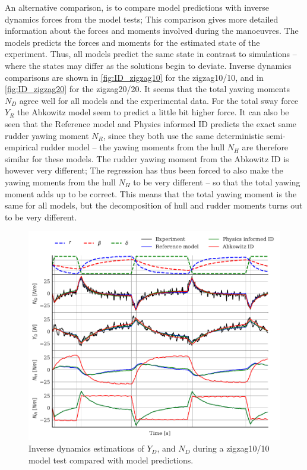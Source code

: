 An alternative comparison, is to compare model predictions with inverse dynamics forces from the model tests; This comparison gives more detailed information about the forces and moments involved during the manoeuvres. The models predicts the forces and moments for the estimated state of the experiment. Thus, all models predict the same state in contrast to simulations -- where the states may differ as the solutions begin to deviate. Inverse dynamics comparisons are shown in \autoref{fig:ID_zigzag10} for the zigzag10/10, and in \autoref{fig:ID_zigzag20} for the zigzag20/20.    
It seems that the total yawing moments $N_D$ agree well for all models and the experimental data. For the total sway force $Y_R$ the Abkowitz model seem to predict a little bit higher force.  
It can also be seen that the Reference model and Physics informed ID predicts the exact same rudder yawing moment $N_R$, since they both use the same deterministic semi-empirical rudder model -- the yawing moments from the hull $N_H$ are therefore similar for these models. The rudder yawing moment from the Abkowitz ID is however very different; The regression has thus been forced to also make the yawing moments from the hull $N_H$ to be very different -- so that the total yawing moment adds up to be correct. This means that the total yawing moment is the same for all models, but the decomposition of hull and rudder moments turns out to be very different.
\begin{figure}[h]
    \centering
    \includegraphics[width=\columnwidth]{figures/results.ID_zigzag10.pdf}
    \caption{Inverse dynamics estimations of $Y_D$, and $N_D$ during a zigzag10/10 model test compared with model predictions.}
    \label{fig:ID_zigzag10}
\end{figure}
